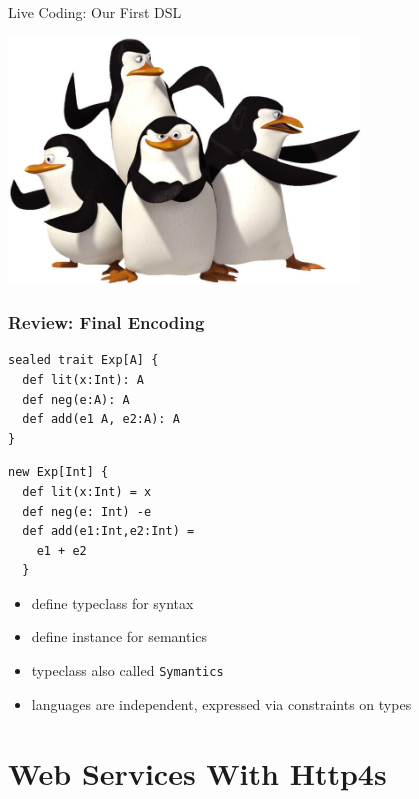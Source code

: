 \documentclass{beamer}
\begin{document}
\begin{frame}
  \begin{center}
    \Huge Live Coding: Our First DSL
  \end{center}
  \begin{center}
    \includegraphics[width=0.7\textwidth]{../pics/penguins.jpg}
  \end{center}
\end{frame}

\begin{frame}[fragile]
  \frametitle{Review: Final Encoding}
  \begin{minipage}[frame=none]{0.45\linewidth}
\begin{verbatim}
sealed trait Exp[A] {
  def lit(x:Int): A
  def neg(e:A): A
  def add(e1 A, e2:A): A
}
\end{verbatim}
  \end{minipage}
  \begin{minipage}[frame=none]{0.45\linewidth}
\begin{verbatim}
new Exp[Int] {
  def lit(x:Int) = x
  def neg(e: Int) -e
  def add(e1:Int,e2:Int) =
    e1 + e2
  }
\end{verbatim}
  \end{minipage}
  \begin{itemize}
  \item define typeclass for syntax
  \item define instance for semantics
  \item typeclass also called \texttt{Symantics}
  \item languages are independent, expressed via constraints on types
  \end{itemize}
\end{frame}

\section{Web Services With Http4s}
\end{document}
